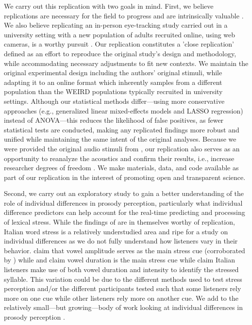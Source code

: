 We carry out this replication with two goals in mind. First, we believe replications are necessary for the field to progress \citep{Rakosi2017} and are intrinsically valuable \citep{Kobrock2023}. We also believe replicating an in-person eye-tracking study carried out in a university setting with a new population of adults recruited online, using web cameras, is a worthy pursuit \citep{Prystauka_Altmann_Rothman_2023}. Our replication constitutes a 'close replication' defined as an effort to reproduce the original study's design and methodology, while accommodating necessary adjustments to fit new contexts\citep{mcmanus2022replication}. We maintain the original experimental design including the authors' original stimuli, while adapting it to an online format which inherently samples from a different population than the WEIRD populations typically recruited in university settings. Although our statistical methods differ—using more conservative approaches (e.g., generalized linear mixed-effects models and LASSO regression) instead of ANOVA—this reduces the likelihood of false positives, as fewer statistical tests are conducted, making any replicated findings more robust and unified while maintaining the same intent of the original analyses. Because we were provided the original audio stimuli from \cite{Sulpizio_McQueen_2012}, our replication also serves as an opportunity to reanalyze the acoustics and confirm their results, i.e., increase researcher degrees of freedom \citep{Corretta2023}. We make materials, data, and code available as part of our replication in the interest of promoting open and transparent science.

Second, we carry out an exploratory study to gain a better understanding of the role of individual differences in prosody perception, particularly what individual difference predictors can help account for the real-time predicting and processing of lexical stress. While the findings of \cite{Sulpizio_McQueen_2012} are in themselves worthy of replication, Italian word stress is a relatively understudied area and ripe for a study on individual differences as we do not fully understand how listeners vary in their behavior. \cite{Maturi1998} claim that vowel amplitude serves as the main stress cue (corroborated by \cite{Sulpizio_McQueen_2012}) while \cite{Alfano2006} and \cite{Alfano2009} claim vowel duration is the main stress cue while \cite{Tagliapietra2005} claim Italian listeners make use of both vowel duration and intensity to identify the stressed syllable. This variation could be due to the different methods used to test stress perception and/or the different participants tested such that some listeners rely more on one cue while other listeners rely more on another cue. We add to the relatively small---but growing---body of work looking at individual differences in prosody perception \citep[e.g.,][]{Roy2017, Bishop2017, Lameris2023, Sinagra2022, Kidd2018}.


